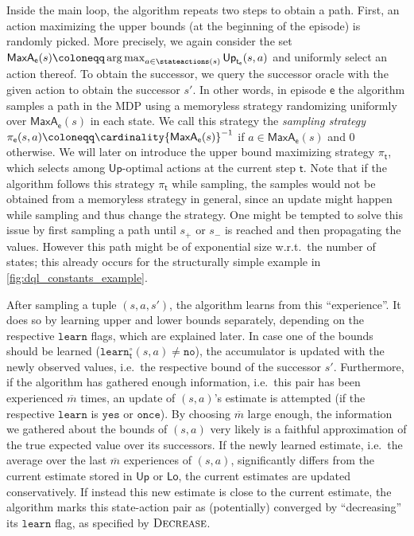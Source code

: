 \documentclass{article}
\DeclareMathOperator*{\argmax}{arg\,max}
\newcommand{\strategy}{\pi}
\newcommand{\upperbound}{\mathsf{Up}}
\newcommand{\lowerbound}{\mathsf{Lo}}
\newcommand{\targetstate}{s_+}
\newcommand{\sinkstate}{s_-}
\newcommand{\delay}{{\overline{m}}}
\newcommand{\learn}{\texttt{learn}}
\newcommand{\learnyes}{\texttt{yes}}
\newcommand{\learnonce}{\texttt{once}}
\newcommand{\learnno}{\texttt{no}}
\newcommand{\learndecrease}{\textsc{Decrease}}
\newcommand{\algostep}{\mathsf{t}}
\newcommand{\algoepisode}{\mathsf{e}}
\newcommand{\umaxactions}{\mathsf{MaxA}}
\begin{document}
Inside the main loop, the algorithm repeats two steps to obtain a path.
First, an action maximizing the upper bounds (at the beginning of the episode) is randomly picked.
More precisely, we again consider the set $\umaxactions_\algoepisode(s) \coloneqq \argmax_{a \in \stateactions(s)} \upperbound_{\algostep_\algoepisode}(s, a)$ and uniformly select an action thereof.
To obtain the successor, we query the successor oracle with the given action to obtain the successor $s'$.
In other words, in episode $\algoepisode$ the algorithm samples a path in the MDP using a memoryless strategy randomizing uniformly over $\umaxactions_\algoepisode(s)$ in each state.
We call this strategy the \emph{sampling strategy} $\strategy_\algoepisode(s, a) \coloneqq \cardinality{\umaxactions_\algoepisode(s)}^{-1}$ if $a \in \umaxactions_\algoepisode(s)$ and $0$ otherwise.
We will later on introduce the upper bound maximizing strategy $\strategy_\algostep$, which selects among $\upperbound$-optimal actions at the current step $\algostep$.
Note that if the algorithm follows this strategy $\strategy_\algostep$ while sampling, the samples would not be obtained from a memoryless strategy in general, since an update might happen while sampling and thus change the strategy.
One might be tempted to solve this issue by first sampling a path until $\targetstate$ or $\sinkstate$ is reached and then propagating the values.
However this path might be of exponential size w.r.t.\ the number of states; this already occurs for the structurally simple example in \cref{fig:dql_constants_example}.

After sampling a tuple $(s, a, s')$, the algorithm learns from this \enquote{experience}.
It does so by learning upper and lower bounds separately, depending on the respective $\learn$ flags, which are explained later.
In case one of the bounds should be learned ($\learn^\circ_\algostep(s, a) \neq \learnno$), the accumulator is updated with the newly observed values, i.e.\ the respective bound of the successor $s'$.
Furthermore, if the algorithm has gathered enough information, i.e.\ this pair has been experienced $\delay$ times, an update of $(s, a)$'s estimate is attempted (if the respective $\learn$ is $\learnyes$ or $\learnonce$).
By choosing $\delay$ large enough, the information we gathered about the bounds of $(s, a)$ very likely is a faithful approximation of the true expected value over its successors.
If the newly learned estimate, i.e.\ the average over the last $\delay$ experiences of $(s, a)$, significantly differs from the current estimate stored in $\upperbound$ or $\lowerbound$, the current estimates are updated conservatively.
If instead this new estimate is close to the current estimate, the algorithm marks this state-action pair as (potentially) converged by \enquote{decreasing} its $\learn$ flag, as specified by $\learndecrease$.
\end{document}
